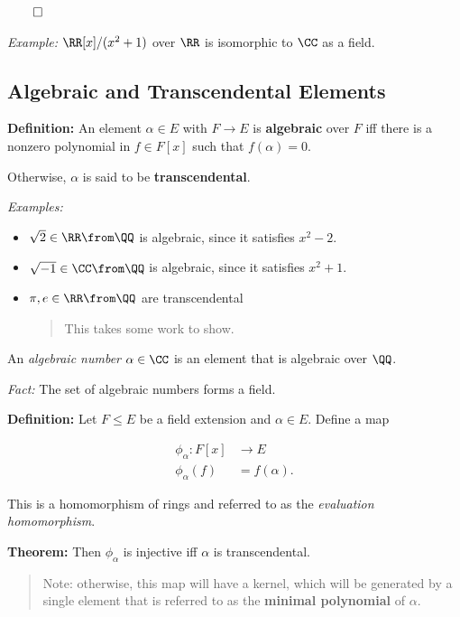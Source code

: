 \(\qed\)

\emph{Example:} \(\RR[x] / (x^2 + 1)\) over \(\RR\) is isomorphic to
\(\CC\) as a field.

\hypertarget{algebraic-and-transcendental-elements}{%
\subsection{Algebraic and Transcendental
Elements}\label{algebraic-and-transcendental-elements}}

\textbf{Definition:} An element \(\alpha \in E\) with \(F \to E\) is
\textbf{algebraic} over \(F\) iff there is a nonzero polynomial in
\(f \in F[x]\) such that \(f(\alpha) = 0\).

Otherwise, \(\alpha\) is said to be \textbf{transcendental}.

\emph{Examples:}

\begin{itemize}
\item
  \(\sqrt 2 \in \RR \from \QQ\) is algebraic, since it satisfies
  \(x^2 - 2\).
\item
  \(\sqrt{-1} \in \CC \from \QQ\) is algebraic, since it satisfies
  \(x^2 + 1\).
\item
  \(\pi, e \in \RR \from \QQ\) are transcendental

  \begin{quote}
  This takes some work to show.
  \end{quote}
\end{itemize}

An \emph{algebraic number} \(\alpha \in \CC\) is an element that is
algebraic over \(\QQ\).

\emph{Fact:} The set of algebraic numbers forms a field.

\textbf{Definition:} Let \(F \leq E\) be a field extension and
\(\alpha \in E\). Define a map

\begin{align*}
\phi_\alpha: F[x] &\to E \\
\phi_\alpha(f) &= f(\alpha)
.\end{align*}

This is a homomorphism of rings and referred to as the \emph{evaluation
homomorphism}.

\textbf{Theorem:} Then \(\phi_\alpha\) is injective iff \(\alpha\) is
transcendental.

\begin{quote}
Note: otherwise, this map will have a kernel, which will be generated by
a single element that is referred to as the \textbf{minimal polynomial}
of \(\alpha\).
\end{quote}

